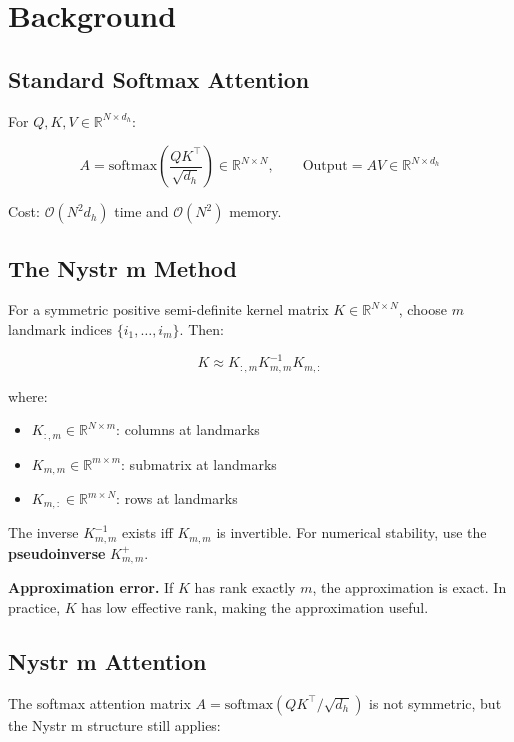 
\section{Background}

\subsection{Standard Softmax Attention}

For $Q, K, V \in \mathbb{R}^{N \times d_h}$:

\[
A = \mathrm{softmax}\!\left(\frac{Q K^\top}{\sqrt{d_h}}\right) \in \mathbb{R}^{N \times N}, \qquad
\text{Output} = A V \in \mathbb{R}^{N \times d_h}
\tag{3.1}
\]

Cost: $\mathcal{O}(N^2 d_h)$ time and $\mathcal{O}(N^2)$ memory.

\subsection{The Nystr m Method}

For a symmetric positive semi-definite kernel matrix $K \in \mathbb{R}^{N \times N}$, 
choose $m$ landmark indices $\{i_1, \dots, i_m\}$. Then:

\[
K \approx K_{:, m} K_{m, m}^{-1} K_{m, :}
\tag{3.2}
\]

where:

\begin{itemize}
\item $K_{:, m} \in \mathbb{R}^{N \times m}$: columns at landmarks
\item $K_{m, m} \in \mathbb{R}^{m \times m}$: submatrix at landmarks
\item $K_{m, :} \in \mathbb{R}^{m \times N}$: rows at landmarks

\end{itemize}
The inverse $K_{m, m}^{-1}$ exists iff $K_{m, m}$ is invertible. For 
numerical stability, use the \textbf{pseudoinverse} $K_{m, m}^+$.

\textbf{Approximation error.} If $K$ has rank exactly $m$, the approximation is 
exact. In practice, $K$ has low effective rank, making the approximation 
useful.

\subsection{Nystr m Attention}

The softmax attention matrix $A = \mathrm{softmax}(Q K^\top / \sqrt{d_h})$ 
is not symmetric, but the Nystr m structure still applies:

